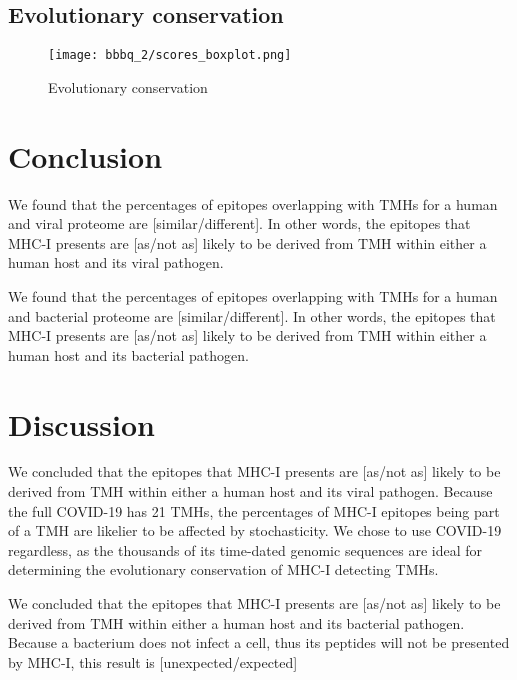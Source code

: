 \subsection{Evolutionary conservation}

\begin{figure}[!htbp]
  \texttt{[image: bbbq\_2/scores\_boxplot.png]}
  \caption{
    Evolutionary conservation
  }
  \label{fig:evolutionary_conservation_boxplot}
\end{figure}

\section{Conclusion}

We found that the percentages of epitopes overlapping 
with TMHs for a human and viral proteome are 
[similar/different]. In other words, the
epitopes that MHC-I presents are [as/not as] likely 
to be derived from TMH within either a human host and its viral pathogen.

We found that the percentages of epitopes overlapping 
with TMHs for a human and bacterial proteome are 
[similar/different]. In other words, the
epitopes that MHC-I presents are [as/not as] likely 
to be derived from TMH within either a human host and its bacterial pathogen.

\section{Discussion}

We concluded that the
epitopes that MHC-I presents are [as/not as] likely 
to be derived from TMH within either a human host and its viral pathogen.
Because the full COVID-19 has 21 TMHs, the percentages
of MHC-I epitopes being part of a TMH are likelier to be affected by
stochasticity. We chose to use COVID-19 regardless, as the thousands
of its time-dated genomic sequences are ideal for determining the 
evolutionary conservation of MHC-I detecting TMHs. 

We concluded that the
epitopes that MHC-I presents are [as/not as] likely 
to be derived from TMH within either a human host and its bacterial pathogen.
Because a bacterium does not infect a cell, thus its peptides
will not be presented by MHC-I, this result is [unexpected/expected]


